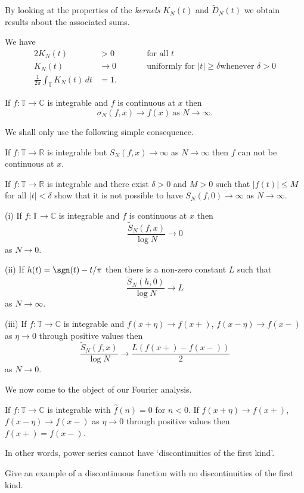 By looking at the properties of the \emph{kernels}
$K_{N}(t)$ and $\tilde{D}_{N}(t)$ we obtain results
about the associated sums.
\begin{lemma} We have
\begin{alignat*}{2}
K_{N}(t)&>0&&\qquad\text{for all $t$}\\
K_{N}(t)&\rightarrow 0&&\qquad
\text{uniformly for $|t|\geq \delta$
whenever $\delta>0$}\\
\frac{1}{2\pi}\int_{\mathbb T}K_{N}(t)\,dt&=1.
\end{alignat*}
\end{lemma}
\begin{theorem}[F\'{e}jer] If $f:{\mathbb T}\rightarrow{\mathbb C}$
is integrable and $f$ is continuous at $x$ then
\[\sigma_{N}(f,x)\rightarrow f(x)\ \text{as $N\rightarrow\infty$}.\]
\end{theorem}
We shall only use the following simple consequence.
\begin{lemma} If $f:{\mathbb T}\rightarrow{\mathbb R}$
is integrable but $S_{N}(f,x)\rightarrow\infty$
as $N\rightarrow\infty$ then
$f$ can not be continuous at $x$.
\end{lemma}
\begin{exercise} If $f:{\mathbb T}\rightarrow{\mathbb R}$
is integrable and there exist $\delta>0$ and $M>0$
such that $|f(t)|\leq M$ for all $|t|<\delta$ show that
it is not possible to have $S_{N}(f,0)\rightarrow\infty$
as $N\rightarrow\infty$.
\end{exercise}

\begin{lemma} (i) If $f:{\mathbb T}\rightarrow{\mathbb C}$
is integrable and $f$ is continuous at $x$ then
\[\frac{\tilde{S}_{N}(f,x)}{\log N}\rightarrow 0\]
as $N\rightarrow 0$.

(ii) If $h(t)=\sgn(t)-t/\pi$ then there is a non-zero
constant $L$ such that
\[\frac{\tilde{S}_{N}(h,0)}{\log N}\rightarrow L\]
as $N\rightarrow \infty$.

(iii) If $f:{\mathbb T}\rightarrow{\mathbb C}$
is integrable and $f(x+\eta)\rightarrow f(x+)$,
$f(x-\eta)\rightarrow f(x-)$ as $\eta\rightarrow 0$
through positive values then
\[\frac{\tilde{S}_{N}(f,x)}{\log N}\rightarrow 
\frac{L(f(x+)-f(x-))}{2}\]
as $N\rightarrow 0$.
\end{lemma}

We now come to the object of our Fourier analysis.
\begin{lemma}\label{jump} If $f:{\mathbb T}\rightarrow{\mathbb C}$
is integrable with $\hat{f}(n)=0$ for $n<0$. If
$f(x+\eta)\rightarrow f(x+)$,
$f(x-\eta)\rightarrow f(x-)$ as $\eta\rightarrow 0$
through positive values then $f(x+)=f(x-)$.
\end{lemma}
In other words, power series cannot have `discontinuities
of the first kind'.
\begin{exercise} Give an example of a discontinuous
function with no discontinuities
of the first kind.
\end{exercise}

